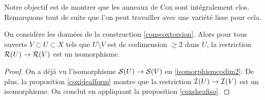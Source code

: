 Notre objectif est de montrer que les anneaux de Cox sont intégralement clos. Remarquons tout de suite que l'on peut travailler avec une variété lisse pour cela.

\begin{prop}\label{isomcodime2CoxTorsion}
On considère les données de la construction \ref{conscoxtorsion}. Alors pour tous ouverts $V\subset U\subset X$ tels que $U\setminus V$ est de codimension $\geq 2$ dans $U$, la restriction $\mathcal{R}(U)\rightarrow \mathcal{R}(V)$ est un isomorphisme.
\end{prop}
\begin{proof}
On a déjà vu l'isomorphisme $\mathcal{S}(U)\rightarrow \mathcal{S}(V)$ en \ref{isomorphismcodim2}. De plus, la proposition \ref{coxidealform} montre que la restriction $\mathcal{I}(U)\rightarrow \mathcal{I}(V)$ est un isomorphisme. On conclut en appliquant la proposition \ref{coxsheafiso}.
\end{proof}

